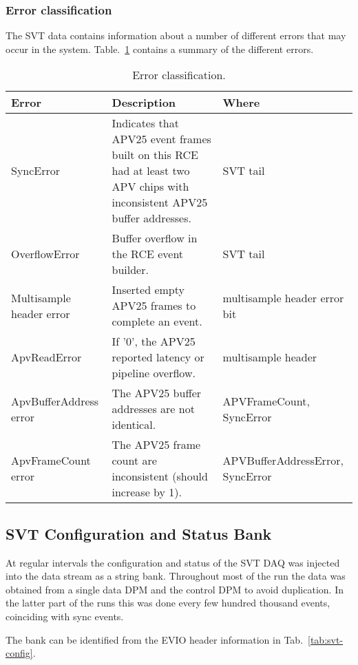 \documentclass{desyproc}
\begin{document}
\subsubsection{Error classification}
The SVT data contains information about a number of different errors that may occur in the system. Table.~\ref{tab:errors} contains a summary 
of the different errors.
\begin{table}[]
  \begin{center}
    \caption{Error classification.}
    \label{tab:errors}
    \begin{tabular}{p{3cm}p{8cm}p{2cm}}
   	\hline
    	\bf Error & \bf Description & \bf Where \\
	\hline
    	SyncError & Indicates that APV25 event frames built on this RCE had at least two APV chips with inconsistent APV25 buffer addresses.  & SVT tail  \\
	\hline
	OverflowError & Buffer overflow in the RCE event builder. & SVT tail \\ 
	\hline
	Multisample header error & Inserted empty APV25 frames to complete an event. & multisample header error bit \\ 
	\hline
	ApvReadError & If '0', the APV25 reported latency or pipeline overflow. & multisample header  \\ 
	\hline
	ApvBufferAddress error & The APV25 buffer addresses are not identical. & APVFrameCount, SyncError  \\ 
	\hline
	ApvFrameCount error & The APV25 frame count are inconsistent (should increase by 1). & APVBufferAddressError, SyncError  \\ 	
	\hline
      \end{tabular}
  \end{center}
\end{table}


\subsection{SVT Configuration and Status Bank}

At regular intervals the configuration and status of the SVT DAQ was injected into the data stream as a string bank. Throughout most of the run the data was obtained from a  single data DPM and the control DPM to avoid duplication. In the latter part of the runs this was done every few hundred thousand events, coinciding with sync events.

The bank can be identified from the EVIO header information in Tab.~\ref{tab:svt-config}.
\end{document}
